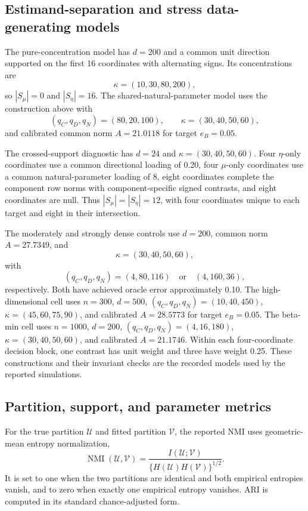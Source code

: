 \documentclass[preprint,12pt,authoryear]{elsarticle}
\begin{document}
\subsection{Estimand-separation and stress data-generating models}

The pure-concentration model has $d=200$ and a common unit direction supported
on the first 16 coordinates with alternating signs. Its concentrations are
\[
\kappa=(10,30,80,200),
\]
so $|S_\mu|=0$ and $|S_\eta|=16$. The shared-natural-parameter model uses the
construction above with
\[
(q_C,q_D,q_N)=(80,20,100),
\qquad
\kappa=(30,40,50,60),
\]
and calibrated common norm $A=21.0118$ for target $e_B=0.05$.

The crossed-support diagnostic has $d=24$ and
$\kappa=(30,40,50,60)$. Four $\eta$-only coordinates use a common directional
loading of 0.20, four $\mu$-only coordinates use a common natural-parameter
loading of 8, eight coordinates complete the component row norms with
component-specific signed contrasts, and eight coordinates are null. Thus
$|S_\mu|=|S_\eta|=12$, with four coordinates unique to each target and eight
in their intersection.

The moderately and strongly dense controls use $d=200$, common norm
$A=27.7349$, and
\[
\kappa=(30,40,50,60),
\]
with
\[
(q_C,q_D,q_N)=(4,80,116)
\quad\text{or}\quad
(4,160,36),
\]
respectively. Both have achieved oracle error approximately 0.10. The
high-dimensional cell uses $n=300$, $d=500$,
$(q_C,q_D,q_N)=(10,40,450)$, $\kappa=(45,60,75,90)$, and calibrated
$A=28.5773$ for target $e_B=0.05$. The beta-min cell uses $n=1000$, $d=200$,
$(q_C,q_D,q_N)=(4,16,180)$, $\kappa=(30,40,50,60)$, and calibrated
$A=21.1746$. Within each four-coordinate decision block, one contrast has
unit weight and three have weight 0.25. These constructions and their
invariant checks are the recorded models used by the reported simulations.

\subsection{Partition, support, and parameter metrics}
\label{sec:support-metrics}

For the true partition $\mathcal U$ and fitted partition $\mathcal V$, the
reported NMI uses geometric-mean entropy normalization,
\[
\operatorname{NMI}(\mathcal U,\mathcal V)
=\frac{I(\mathcal U;\mathcal V)}
{\{H(\mathcal U)H(\mathcal V)\}^{1/2}}.
\]
It is set to one when the two partitions are identical and both empirical
entropies vanish, and to zero when exactly one empirical entropy vanishes.
ARI is computed in its standard chance-adjusted form.
\end{document}
